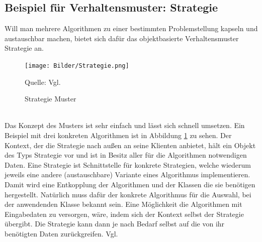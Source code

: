 \documentclass[fontsize=11pt,a4paper,final]{scrreprt}[2003/01/01]
\newcommand*{\quelle}{%
	\footnotesize Quelle: 
}
\begin{document}
\subsection{Beispiel für Verhaltensmuster: Strategie}
Will man mehrere Algorithmen zu einer bestimmten Problemstellung kapseln und austauschbar machen, bietet sich dafür das objektbasierte Verhaltensmuster Strategie an.

\begin{figure}[H]
	\centering
	\texttt{[image: Bilder/Strategie.png]}
	\caption{Strategie Muster}
	\quelle{Vgl. \cite[S. 375]{gamma2004}} 
	\label{fig:Strategie}
\end{figure}
\ \\
Das Konzept des Musters ist sehr einfach und lässt sich schnell umsetzen. Ein Beispiel mit drei konkreten Algorithmen ist in Abbildung \ref{fig:Strategie} zu sehen. Der Kontext, der die Strategie nach außen an seine Klienten anbietet, hält ein Objekt des Typs Strategie vor und ist in Besitz aller für die Algorithmen notwendigen Daten. Eine Strategie ist Schnittstelle für konkrete Strategien, welche wiederum jeweils eine andere (austauschbare) Variante eines Algorithmus implementieren. Damit wird eine Entkopplung der Algorithmen und der Klassen die sie benötigen hergestellt. Natürlich muss dafür der konkrete Algorithmus für die Auswahl, bei der anwendenden Klasse bekannt sein. Eine Möglichkeit die Algorithmen mit Eingabedaten zu versorgen, wäre, indem sich der Kontext selbst der Strategie übergibt. Die Strategie kann dann je nach Bedarf selbst auf die von ihr benötigten Daten zurückgreifen. Vgl. \cite[S. 373 - 384]{gamma2004}
\end{document}
